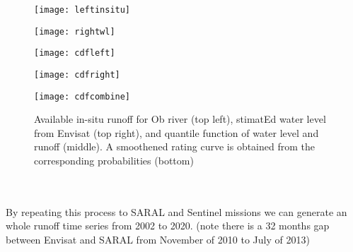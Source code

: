 \begin{figure}[htbp]
	\centering
	\begin{minipage}[t]{0.45\textwidth}
		\centering
		\texttt{[image: leftinsitu]} %
	\end{minipage}
	\begin{minipage}[t]{0.45\textwidth}
		\centering
		\texttt{[image: rightwl]} %
	\end{minipage}
	\begin{minipage}[t]{0.45\textwidth}
		\centering
		\texttt{[image: cdfleft]} %
	\end{minipage}
	\begin{minipage}[t]{0.45\textwidth}
		\centering
		\texttt{[image: cdfright]} %
	\end{minipage}
	\begin{minipage}[t]{0.45\textwidth}
		\centering
		\texttt{[image: cdfcombine]} %
	\end{minipage}
	\caption{Available in-situ runoff for Ob river (top left), stimatEd water level from Envisat (top right), and quantile function of water level and runoff (middle). A smoothened rating curve is obtained from the corresponding probabilities (bottom)}
	\label{fig:wltodischarge}
\end{figure}\\\\
By repeating this process to SARAL and Sentinel missions we can generate an whole runoff time series from 2002 to 2020. (note there is a 32 months gap between Envisat and SARAL from November of 2010 to July of 2013) 